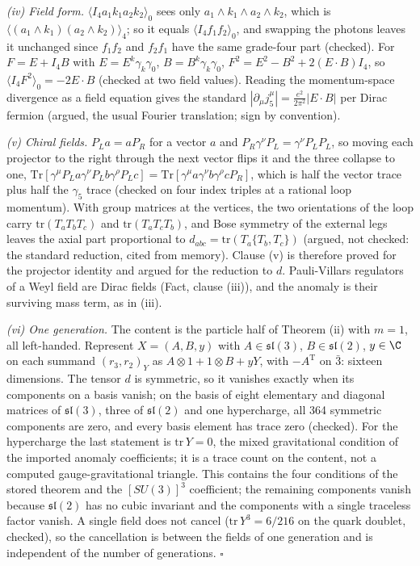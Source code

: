 \emph{(iv) Field form.} $\langle I_{4}a_{1}k_{1}a_{2}k_{2}\rangle_{0}$ sees only $a_{1}\wedge k_{1}\wedge a_{2}\wedge k_{2}$, which is $\langle (a_{1}\wedge k_{1})(a_{2}\wedge k_{2})\rangle_{4}$; so it equals $\langle I_{4}f_{1}f_{2}\rangle_{0}$, and swapping the photons leaves it unchanged since $f_{1}f_{2}$ and $f_{2}f_{1}$ have the same grade-four part (checked). For $F = E + I_{4}B$ with $E = E^{k}\gamma_{k}\gamma_{0}$, $B = B^{k}\gamma_{k}\gamma_{0}$, $F^{2} = E^{2} - B^{2} + 2(E\cdot B)I_{4}$, so $\langle I_{4}F^{2}\rangle_{0} = -2E\cdot B$ (checked at two field values). Reading the momentum-space divergence as a field equation gives the standard $|\partial_{\mu}j_{5}^{\mu}| = \tfrac{e^{2}}{2\pi^{2}}|E\cdot B|$ per Dirac fermion (argued, the usual Fourier translation; sign by convention).

\emph{(v) Chiral fields.} $P_{L}a = aP_{R}$ for a vector $a$ and $P_{R}\gamma^{\nu}P_{L} = \gamma^{\nu}P_{L}P_{L}$, so moving each projector to the right through the next vector flips it and the three collapse to one, $\mathrm{Tr}[\gamma^{\mu}P_{L}a\gamma^{\nu}P_{L}b\gamma^{\rho}P_{L}c] = \mathrm{Tr}[\gamma^{\mu}a\gamma^{\nu}b\gamma^{\rho}cP_{R}]$, which is half the vector trace plus half the $\gamma_{5}$ trace (checked on four index triples at a rational loop momentum). With group matrices at the vertices, the two orientations of the loop carry $\mathrm{tr}(T_{a}T_{b}T_{c})$ and $\mathrm{tr}(T_{a}T_{c}T_{b})$, and Bose symmetry of the external legs leaves the axial part proportional to $d_{abc} = \mathrm{tr}(T_{a}\{T_{b}, T_{c}\})$ (argued, not checked: the standard reduction, cited from memory). Clause (v) is therefore proved for the projector identity and argued for the reduction to $d$. Pauli-Villars regulators of a Weyl field are Dirac fields (Fact, clause (iii)), and the anomaly is their surviving mass term, as in (iii).

\emph{(vi) One generation.} The content is the particle half of Theorem (ii) with $m = 1$, all left-handed. Represent $X = (A, B, y)$ with $A \in \mathfrak{sl}(3)$, $B \in \mathfrak{sl}(2)$, $y \in \C$ on each summand $(r_{3}, r_{2})_{Y}$ as $A \otimes 1 + 1 \otimes B + yY$, with $-A^{\mathrm{T}}$ on $\bar 3$: sixteen dimensions. The tensor $d$ is symmetric, so it vanishes exactly when its components on a basis vanish; on the basis of eight elementary and diagonal matrices of $\mathfrak{sl}(3)$, three of $\mathfrak{sl}(2)$ and one hypercharge, all 364 symmetric components are zero, and every basis element has trace zero (checked). For the hypercharge the last statement is $\mathrm{tr}\,Y = 0$, the mixed gravitational condition of the imported anomaly coefficients; it is a trace count on the content, not a computed gauge-gravitational triangle. This contains the four conditions of the stored theorem and the $[SU(3)]^{3}$ coefficient; the remaining components vanish because $\mathfrak{sl}(2)$ has no cubic invariant and the components with a single traceless factor vanish. A single field does not cancel ($\mathrm{tr}\,Y^{3} = 6/216$ on the quark doublet, checked), so the cancellation is between the fields of one generation and is independent of the number of generations. $\square$
